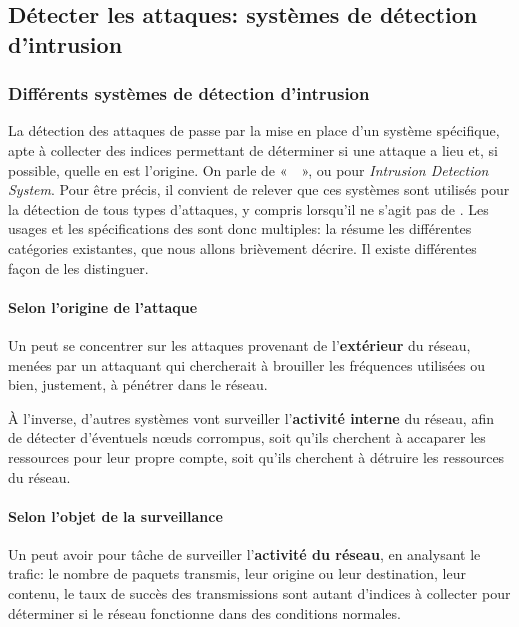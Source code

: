 \subsection{Détecter les attaques: systèmes de détection d'intrusion}

    \subsubsection{Différents systèmes de détection d'intrusion}
La détection des attaques de \dds passe par la mise en place d'un système spécifique, apte à collecter des indices permettant de déterminer si une attaque a lieu et, si possible, quelle en est l'origine.
On parle de « \idss », ou \IDS pour \textit{Intrusion Detection System}.
Pour être précis, il convient de relever que ces systèmes sont utilisés pour la détection de tous types d'attaques, y compris lorsqu'il ne s'agit pas de \dds.
Les usages et les spécifications des \IDS sont donc multiples: la  résume les différentes catégories existantes, que nous allons brièvement décrire.
Il existe différentes façon de les distinguer.


        \paragraph{Selon l'origine de l'attaque}
Un \ids peut se concentrer sur les attaques provenant de l'\textbf{extérieur} du réseau, menées par un attaquant qui chercherait à brouiller les fréquences utilisées ou bien, justement, à pénétrer dans le réseau.

À l'inverse, d'autres systèmes vont surveiller l'\textbf{activité interne} du réseau, afin de détecter d'éventuels nœuds corrompus, soit qu'ils cherchent à accaparer les ressources pour leur propre compte, soit qu'ils cherchent à détruire les ressources du réseau.

        \paragraph{Selon l'objet de la surveillance}\label{ea:sss:hids}
Un \IDS peut avoir pour tâche de surveiller l'\textbf{activité du réseau}, en analysant le trafic: le nombre de paquets transmis, leur origine ou leur destination, leur contenu, le taux de succès des transmissions sont autant d'indices à collecter pour déterminer si le réseau fonctionne dans des conditions normales.

